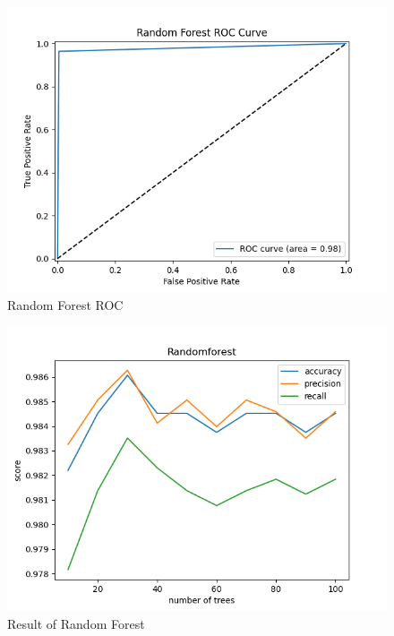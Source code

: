 \begin{figure}[H] %
    \centering
    \includegraphics[width=0.75\linewidth]{figs/random-forest-ROC.png}
    \caption{Random Forest ROC}
    \vspace{-8mm}
\end{figure}




\begin{figure}[H] %
    \centering
    \includegraphics[width=0.75\linewidth]{figs/randomforest_scores(final).png}
    \caption{Result of Random Forest}
    \vspace{-7.5mm}
\end{figure}


